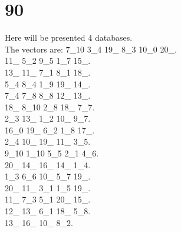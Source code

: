 \chapter{90}
\indent Here will be presented 4 databases.\\
The vectors are:
7\_10 3\_4 19\_ 8\_3 10\_0 20\_.\\11\_ 5\_2 9\_5 1\_7 15\_.\\13\_ 11\_ 7\_1 8\_1 18\_.\\5\_4 8\_4 1\_9 19\_ 14\_.\\7\_4 7\_8 8\_8 12\_ 13\_.\\18\_ 8\_10 2\_8 18\_ 7\_7.\\2\_3 13\_ 1\_2 10\_ 9\_7.\\16\_0 19\_ 6\_2 1\_8 17\_.\\2\_4 10\_ 19\_ 11\_ 3\_5.\\9\_10 1\_10 5\_5 2\_1 4\_6.\\20\_ 14\_ 16\_ 14\_ 1\_4.\\1\_3 6\_6 10\_ 5\_7 19\_.\\20\_ 11\_ 3\_1 1\_5 19\_.\\11\_ 7\_3 5\_1 20\_ 15\_.\\12\_ 13\_ 6\_1 18\_ 5\_8.\\13\_ 16\_ 10\_ 8\_2.\\